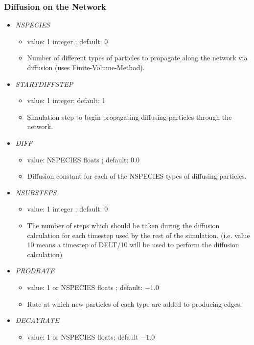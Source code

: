 \documentclass[12pt]{article}
\begin{document}
\subsubsection*{Diffusion on the Network}
\begin{itemize}
%
\item {\it NSPECIES}
  \begin{itemize}
    \item  value: 1 integer ; default: $0$
    \item Number of different types of particles to propagate along the network via diffusion (uses Finite-Volume-Method).
  \end{itemize}
%
\item {\it STARTDIFFSTEP}
  \begin{itemize}
    \item  value: 1 integer; default: 1
    \item Simulation step to begin propagating diffusing particles through the network.
  \end{itemize}
%
\item {\it DIFF}
  \begin{itemize}
    \item  value: NSPECIES floats ; default: 0.0
    \item Diffusion constant for each of the NSPECIES types of diffusing particles.
  \end{itemize}
%
\item {\it NSUBSTEPS}
  \begin{itemize}
    \item  value: 1 integer ; default: 0
    \item The number of steps which should be taken during the diffusion calculation for each timestep used by the rest of the simulation. (i.e. value 10 means a timestep of DELT/10 will be used to perform the diffusion calculation)
  \end{itemize}
%
\item {\it PRODRATE}
  \begin{itemize}
    \item  value: 1 or NSPECIES floats ; default: $-1.0$
    \item Rate at which new particles of each type are added to producing edges.
  \end{itemize}
%
\item {\it DECAYRATE}
  \begin{itemize}
    \item  value: 1 or NSPECIES floats; default $-1.0$

\end{itemize}
\end{itemize}
\end{document}
